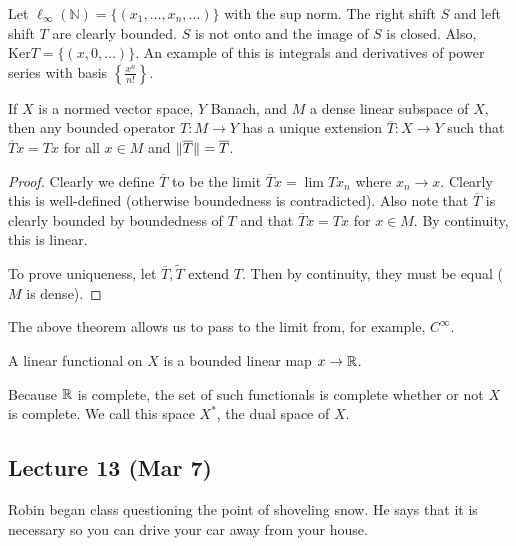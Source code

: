 \documentclass[10pt, twoside]{article}
\begin{document}
    \begin{exm} Let $\ell_{\infty}(\mathbb{N}) = \{(x_1, \ldots, x_n,
        \ldots)\}$ with the sup norm. The right shift $S$ and left shift $T$
        are clearly bounded. $S$ is not onto and the image of $S$ is closed.
        Also, $\mathrm{Ker} T = \{(x,0,\ldots)\}$. An example of this is
        integrals and derivatives of power series with basis $\left\{
        \frac{x^n}{n!} \right\}$.  \end{exm}

    \begin{thm}[BLT] If $X$ is a normed vector space, $Y$ Banach, and $M$ a
        dense linear subspace of $X$, then any bounded operator $T:M \to Y$ has
        a unique extension $\overline{T}:X \to Y$ such that $\overline{T}x =
        Tx$ for all $x \in M$ and $\lVert\overline{T}\rVert = \overline{T}$.
        \begin{proof} Clearly we define $\overline{T}$ to be the limit
            $\overline{T}x = \lim Tx_n$ where $x_n \to x$. Clearly this is
            well-defined (otherwise boundedness is contradicted). Also note
            that $\overline{T}$ is clearly bounded by boundedness of $T$ and
            that $\overline{T}x = Tx$ for $x \in M$. By continuity, this is
            linear.

            To prove uniqueness, let $\overline{T}, \widetilde{T}$ extend $T$.
            Then by continuity, they must be equal ($M$ is dense).  \end{proof}
            \end{thm} \begin{rmk} The above theorem allows us to pass to the
            limit from, for example, $C^{\infty}$.  \end{rmk}
            \begin{defn} A linear functional on $X$ is a
            bounded linear map $x \to \mathbb{R}$.  \end{defn}

    Because $\mathbb{R}$ is complete, the set of such functionals is complete whether
    or not $X$ is complete. We call this space $X^*$, the dual space of $X$.

    \subsection{Lecture 13 (Mar 7)} Robin began class questioning the point of
    shoveling snow. He says that it is necessary so you can drive your car away
    from your house.
\end{document}
